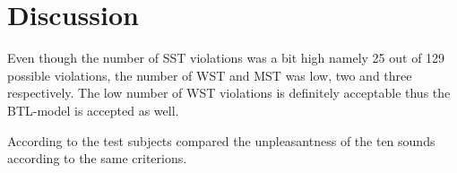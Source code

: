 \section*{Discussion}
\label{Discussion}
%
Even though the number of SST violations was a bit high namely 25 out of 129 possible violations, the number of WST and MST was low, two and three respectively. The low number of WST violations is definitely acceptable thus the BTL-model is accepted as well.

According to \textcite[p. 213]{Zimmer2003} the test subjects compared the unpleasantness of the ten sounds according to the same criterions.   
